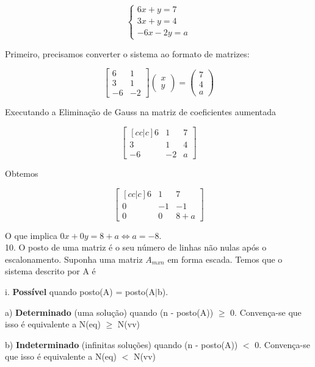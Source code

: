 \documentclass{article}
\begin{document}
\[ \begin{cases} 6x + y = 7 \\ 3x + y = 4 \\ -6x - 2y = a
\end{cases}
\]

Primeiro, precisamos converter o sistema ao formato de matrizes:

\[ \begin{bmatrix} 6 & 1 \\ 3 & 1 \\ -6 & -2 
\end{bmatrix}
\begin{pmatrix} x \\ y \end{pmatrix} =
\begin{pmatrix} 7 \\ 4 \\ a \end{pmatrix}
\]

Executando a Eliminação de Gauss na matriz de coeficientes aumentada

\[ \begin{bmatrix}[cc|c]
6 & 1 & 7\\ 
3 & 1 & 4 \\
-6 & -2 & a
\end{bmatrix} \]

Obtemos

\[\begin{bmatrix}[cc|c]
6 & 1 & 7\\ 
0 & -1 & -1 \\
0 & 0 & 8 + a
\end{bmatrix} \]

O que implica $0x + 0y = 8 + a \Longleftrightarrow{} a = -8$. 
\vspace{5mm}
\\ 
10. O posto de uma matriz é o seu número de linhas não nulas após o escalonamento. Suponha uma matriz $A_{mxn}$ em forma escada. Temos que o sistema descrito por A é \vspace{2mm}

\par i. \textbf{Possível} quando posto(A) = posto(A$\mid$b).
\par \hspace{4mm} a) \textbf{Determinado} (uma solução) quando (n - posto(A)) $\geq$ 0. Convença-se que isso é equivalente a N(eq) $\geq$ N(vv)
\par \hspace{4mm} b) \textbf{Indeterminado} (infinitas soluções) quando (n - posto(A)) $<$ 0. Convença-se que isso é equivalente a N(eq) $<$ N(vv) \vspace{1mm}
\end{document}
